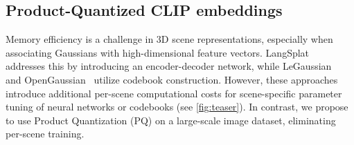 \subsection{Product-Quantized CLIP embeddings}
\label{subsec:4_2}

Memory efficiency is a challenge in 3D scene representations, especially when associating Gaussians with high-dimensional feature vectors. LangSplat~\cite{langsplat} addresses this by introducing an encoder-decoder network, while LeGaussian~\cite{legaussian} and OpenGaussian~\cite{open_gaussian} utilize codebook construction. However, these approaches introduce additional per-scene computational costs for scene-specific parameter tuning of neural networks or codebooks (see \cref{fig:teaser}). In contrast, we propose to use Product Quantization (PQ) on a large-scale image dataset, eliminating per-scene training.
